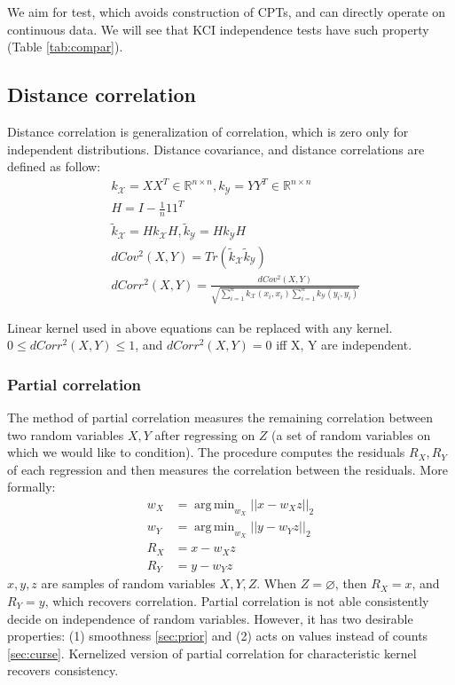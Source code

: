 \documentclass{article} %
\DeclareMathOperator*{\argmin}{arg\,min}
\begin{document}
We aim for test, which avoids construction of CPTs, and can directly operate on continuous data.
We will see that KCI independence tests have such property (Table \ref{tab:compar}).


\subsection{Distance correlation}\label{sec:dist}
Distance correlation \cite{szekely2007measuring} is generalization of correlation, which is zero only for independent distributions.
Distance covariance, and distance correlations are defined as follow:
\begin{align*}
  &k_\mathcal{X} = XX^T \in \mathbb{R}^{n \times n},
  k_\mathcal{Y} = YY^T \in \mathbb{R}^{n \times n}\\
  &H = I - \frac{1}{n}11^T \\
  &\tilde{k}_\mathcal{X} = Hk_{\mathcal{X}}H, 
  \tilde{k}_\mathcal{Y} = Hk_{\mathcal{Y}}H \\
  &dCov^2(X, Y) = Tr(\tilde{k}_\mathcal{X}\tilde{k}_\mathcal{Y}) \\
  &dCorr^2(X, Y) = \frac{dCov^2(X, Y)}{\sqrt{\sum_{i=1}^nk_{\mathcal{X}}(x_i, x_i) \sum_{i=1}^nk_{\mathcal{Y}}(y_i, y_i)}} 
\end{align*}

Linear kernel used in above equations can be replaced with any kernel. $0 \leq dCorr^2(X, Y) \leq 1$, and $dCorr^2(X, Y) = 0$ iff X, Y are independent. 

\subsubsection{Partial correlation}\label{sec:corr}
The method of partial correlation measures the remaining correlation between two random variables $X, Y$ after regressing on $Z$ (a set of random 
variables on which we would like to condition).  The procedure computes the residuals $R_X, R_Y$ of each regression and then measures the correlation between the residuals. More formally:
\begin{align*}
  w_X &= \argmin_{w_X} ||x - w_X z||_{2} \\
  w_Y &= \argmin_{w_X} ||y - w_Y z||_{2} \\
  R_X &= x - w_X z \\
  R_Y &= y - w_Y z
\end{align*}
$x, y, z$ are samples of random variables $X, Y, Z$. When $Z = \varnothing$, then $R_X = x$, and $R_Y = y$, which
recovers correlation. Partial correlation is not able consistently decide
on independence of random variables. However, it has two desirable properties: (1) smoothness \ref{sec:prior} and (2)
acts on values instead of counts \ref{sec:curse}. Kernelized version of partial correlation for 
characteristic kernel recovers consistency.
\end{document}
